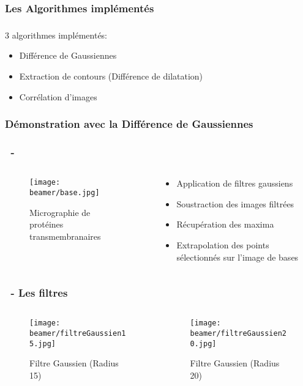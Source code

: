 \documentclass[11pt]{beamer}
\begin{document}
\subsubsection*{Les Algorithmes implémentés}
\begin{frame}
\frametitle{\subsubsecname}
\begin{block}{3 algorithmes implémentés:}
\begin{itemize}
\item Différence de Gaussiennes 
\item Extraction de contours (Différence de dilatation)
\item Corrélation d'images
\end{itemize}
\end{block}
\end{frame}
\subsubsection*{Démonstration avec la Différence de Gaussiennes}
\begin{frame}
\frametitle{\subsecname ~- \subsubsecname}%
	\begin{columns}
		\begin{column}{5cm}
			\begin{figure}
				\texttt{[image: beamer/base.jpg]}
	
				Micrographie de protéines transmembranaires
			\end{figure}
		\end{column}
		\begin{column}{5cm}
			\begin{itemize}
				\item Application de filtres gaussiens
				\item Soustraction des images filtrées
				\item Récupération des maxima
				\item Extrapolation des points sélectionnés sur l'image de bases
			\end{itemize}
		\end{column}
	\end{columns}
\end{frame}
\begin{frame}
\frametitle{\subsecname ~- Les filtres}
	\begin{columns}
		\begin{column}{5cm}
			\begin{figure}
				\texttt{[image: beamer/filtreGaussien15.jpg]}
				
				Filtre Gaussien (Radius 15)
			\end{figure}			
		\end{column}
		\begin{column}{5cm}
			\begin{figure}
				\texttt{[image: beamer/filtreGaussien20.jpg]}
				
				Filtre Gaussien (Radius 20)
			\end{figure}
		\end{column}
	\end{columns}
\end{frame}
\end{document}
